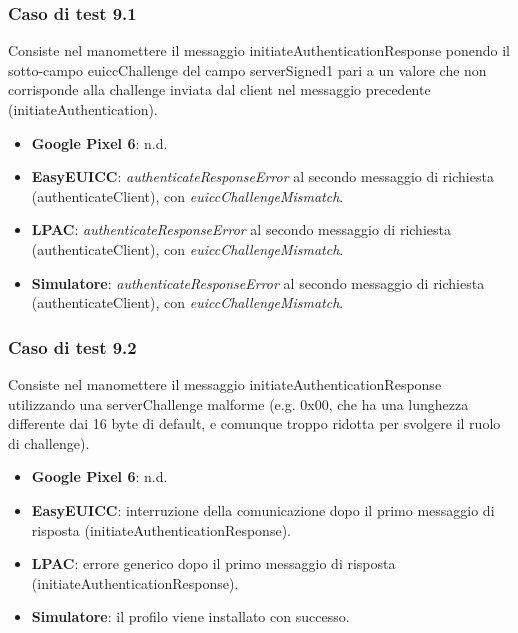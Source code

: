\documentclass[10pt, oneside]{book}
\begin{document}
\subsubsection{Caso di test 9.1}
Consiste nel manomettere il messaggio initiateAuthenticationResponse ponendo il sotto-campo euiccChallenge del campo serverSigned1 pari a un valore che non corrisponde alla challenge inviata dal client nel messaggio precedente (initiateAuthentication).
\begin{itemize}
\item \textbf{Google Pixel 6}: n.d.
\item \textbf{EasyEUICC}: \textit{authenticateResponseError} al secondo messaggio di richiesta (authenticateClient), con \textit{euiccChallengeMismatch}.
\item \textbf{LPAC}: \textit{authenticateResponseError} al secondo messaggio di richiesta (authenticateClient), con \textit{euiccChallengeMismatch}.
\item \textbf{Simulatore}: \textit{authenticateResponseError} al secondo messaggio di richiesta (authenticateClient), con \textit{euiccChallengeMismatch}.
\end{itemize}

\subsubsection{Caso di test 9.2}
Consiste nel manomettere il messaggio initiateAuthenticationResponse utilizzando una serverChallenge malforme (e.g. 0x00, che ha una lunghezza differente dai 16 byte di default, e comunque troppo ridotta per svolgere il ruolo di challenge).
\begin{itemize}
\item \textbf{Google Pixel 6}: n.d.
\item \textbf{EasyEUICC}: interruzione della comunicazione dopo il primo messaggio di risposta (initiateAuthenticationResponse).
\item \textbf{LPAC}: errore generico dopo il primo messaggio di risposta (initiateAuthenticationResponse).
\item \textbf{Simulatore}: il profilo viene installato con successo.
\end{itemize}
\end{document}
